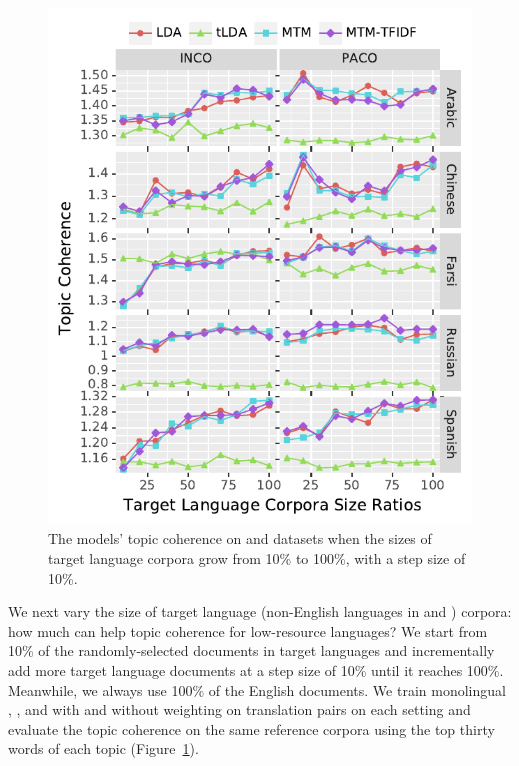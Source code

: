 \begin{figure}[t]
  \centering
  \includegraphics[width=\linewidth]{2019_emnlp_mtm/figures/ratio_vertical.pdf}
  \caption{The models' topic coherence on \inco and \paco datasets
    when the sizes of target language corpora grow from 10\% to 100\%,
    with a step size of 10\%.  }\label{fig:ratio}
\end{figure}

We next vary the size of target language (non-English languages in
\paco and \inco) corpora: how much can \mtm help topic coherence for
low-resource languages?
%
We start from 10\% of the randomly-selected documents in
target languages and incrementally add more target language documents
at a step size of 10\% until it reaches 100\%.
%
Meanwhile, we always use 100\% of the English documents.
%
We train monolingual \lda, \ptlda, and \mtms with and without \tfidf
weighting on translation pairs on each setting and evaluate the topic
coherence on the same reference corpora using the top thirty words of
each topic (Figure~\ref{fig:ratio}).

